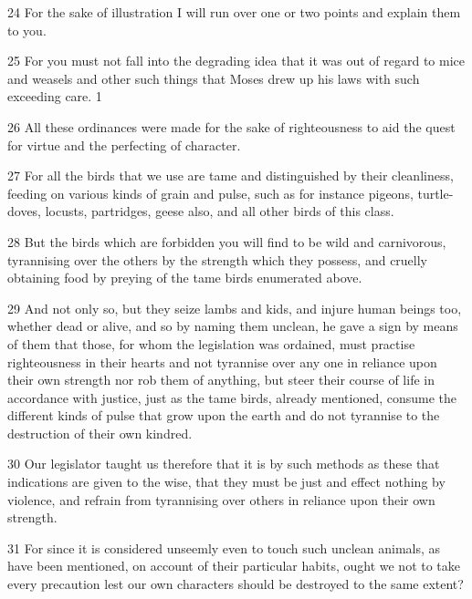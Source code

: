 \par 24 For the sake of illustration I will run over one or two points and explain them to you.

\par 25 For you must not fall into the degrading idea that it was out of regard to mice and weasels and other such things that Moses drew up his laws with such exceeding care. 1

\par 26 All these ordinances were made for the sake of righteousness to aid the quest for virtue and the perfecting of character.

\par 27 For all the birds that we use are tame and distinguished by their cleanliness, feeding on various kinds of grain and pulse, such as for instance pigeons, turtle-doves, locusts, partridges, geese also, and all other birds of this class.

\par 28 But the birds which are forbidden you will find to be wild and carnivorous, tyrannising over the others by the strength which they possess, and cruelly obtaining food by preying of the tame birds enumerated above.

\par 29 And not only so, but they seize lambs and kids, and injure human beings too, whether dead or alive, and so by naming them unclean, he gave a sign by means of them that those, for whom the legislation was ordained, must practise righteousness in their hearts and not tyrannise over any one in reliance upon their own strength nor rob them of anything, but steer their course of life in accordance with justice, just as the tame birds, already mentioned, consume the different kinds of pulse that grow upon the earth and do not tyrannise to the destruction of their own kindred.

\par 30 Our legislator taught us therefore that it is by such methods as these that indications are given to the wise, that they must be just and effect nothing by violence, and refrain from tyrannising over others in reliance upon their own strength.

\par 31 For since it is considered unseemly even to touch such unclean animals, as have been mentioned, on account of their particular habits, ought we not to take every precaution lest our own characters should be destroyed to the same extent?

